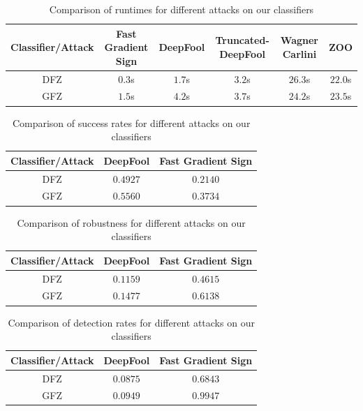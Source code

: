 \documentclass[10pt,twocolumn,letterpaper]{article}
\begin{document}
\begin{table}[ht]
    \centering
    \begin{tabular}{|c|c|c|c|c|c|}
        \hline
        \textbf{Classifier/Attack} & \textbf{Fast Gradient Sign} & \textbf{DeepFool} & \textbf{Truncated-DeepFool} & \textbf{Wagner Carlini} & \textbf{ZOO} \\
        \hline
        DFZ & $0.3$s & $1.7$s & $3.2$s & $26.3$s & $22.0$s \\
        \hline
        GFZ & $1.5$s & $4.2$s & $3.7$s & $24.2$s & $23.5$s \\
        \hline
    \end{tabular}
    \caption{Comparison of runtimes for different attacks on our classifiers}
    \label{tab:runtimes}
\end{table}

\begin{table}[ht]
    \centering
    \begin{tabular}{|c|c|c|}
        \hline
        \textbf{Classifier/Attack} & \textbf{DeepFool} & \textbf{Fast Gradient Sign} \\
        \hline
        DFZ & $0.4927$ & $0.2140$ \\
        \hline
        GFZ & $0.5560$ & $0.3734$ \\
        \hline
    \end{tabular}
    \caption{Comparison of success rates for different attacks on our classifiers}
    \label{tab:success_rates}
\end{table}

\begin{table}[ht]
    \centering
    \begin{tabular}{|c|c|c|}
        \hline
        \textbf{Classifier/Attack} & \textbf{DeepFool} & \textbf{Fast Gradient Sign} \\
        \hline
        DFZ & $0.1159$ & $0.4615$ \\
        \hline
        GFZ & $0.1477$ & $0.6138$ \\
        \hline
    \end{tabular}
    \caption{Comparison of robustness for different attacks on our classifiers}
    \label{tab:perturbation_norms}
\end{table}

\begin{table}[ht]
    \centering
    \begin{tabular}{|c|c|c|}
        \hline
        \textbf{Classifier/Attack} & \textbf{DeepFool} & \textbf{Fast Gradient Sign} \\
        \hline
        DFZ & $0.0875$ & $0.6843$ \\
        \hline
        GFZ & $0.0949$ & $0.9947$ \\
        \hline
    \end{tabular}
    \caption{Comparison of detection rates for different attacks on our classifiers}
    \label{tab:detection_rates}
\end{table}
\end{document}
